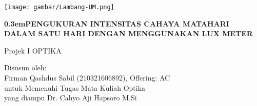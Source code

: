 \clearpage
\hspace*{-0.26in}
\begin{minipage}{0.3\textwidth}
\flushleft\texttt{[image: gambar/Lambang-UM.png]}
\end{minipage}
\newcommand\nbvspace[1][3]{\vspace*{\stretch{#1}}}
\newcommand\nbstretchyspace{\spaceskip0.5em plus 0.25em minus 0.25em}
\newcommand{\nbtitlestretch}{\spaceskip0.3em}
\pagestyle{empty}
\begin{flushleft}
\bfseries
\vspace{6mm}
\Huge
{
	\nbtitlestretch\fontsize{18pt}{18pt}\selectfont PENGUKURAN INTENSITAS CAHAYA MATAHARI DALAM SATU HARI DENGAN MENGGUNAKAN LUX METER
}

\vspace{0.5em}
\normalfont\small Projek I OPTIKA
\vspace{1em}

\normalfont\small Disusun oleh:\\
\normalfont\small Firman Qashdus Sabil (210321606892), Offering: AC\\%
\normalfont\small untuk Memenuhi Tugas Mata Kuliah Optika \\
\normalfont\small yang diampu Dr. Cahyo Aji Hapsoro M.Si


\end{flushleft}
